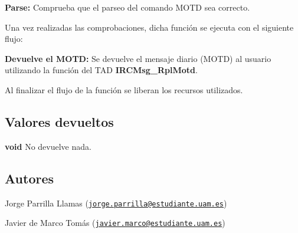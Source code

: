 \begin{DoxyItemize}
\item {\bfseries Parse\+:} Comprueba que el parseo del comando M\+O\+TD sea correcto. 
\end{DoxyItemize}

Una vez realizadas las comprobaciones, dicha función se ejecuta con el siguiente flujo\+:


\begin{DoxyItemize}
\item {\bfseries Devuelve el M\+O\+TD\+:} Se devuelve el mensaje diario (M\+O\+TD) al usuario utilizando la función del T\+AD {\bfseries I\+R\+C\+Msg\+\_\+\+Rpl\+Motd}.  
\end{DoxyItemize}

Al finalizar el flujo de la función se liberan los recursos utilizados.\hypertarget{server_command_motd_return_motd}{}\subsection{Valores devueltos}\label{server_command_motd_return_motd}

\begin{DoxyItemize}
\item {\bfseries void} No devuelve nada. 
\end{DoxyItemize}\hypertarget{server_command_motd_authors_motd}{}\subsection{Autores}\label{server_command_motd_authors_motd}

\begin{DoxyItemize}
\item Jorge Parrilla Llamas (\href{mailto:jorge.parrilla@estudiante.uam.es}{\tt jorge.\+parrilla@estudiante.\+uam.\+es}) 
\item Javier de Marco Tomás (\href{mailto:javier.marco@estudiante.uam.es}{\tt javier.\+marco@estudiante.\+uam.\+es}) 
\end{DoxyItemize}